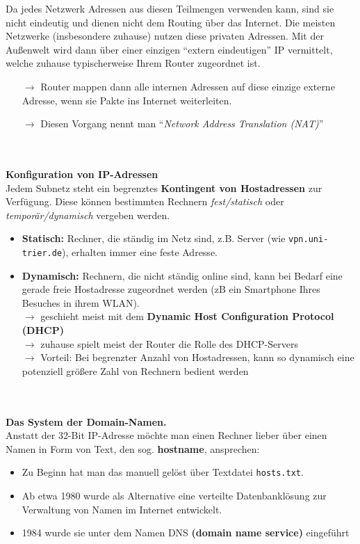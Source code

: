 %
Da jedes Netzwerk Adressen aus diesen Teilmengen verwenden kann, sind sie nicht eindeutig und dienen nicht dem Routing über das Internet. Die meisten Netzwerke (insbesondere zuhause) nutzen diese privaten Adressen. Mit der Außenwelt wird dann über einer einzigen ``extern eindeutigen'' IP vermittelt, welche zuhause typischerweise Ihrem Router zugeordnet ist.
\begin{itemize}
	\item[$\to$] Router mappen dann alle internen Adressen auf diese einzige externe Adresse, wenn sie Pakte ins Internet weiterleiten. 
\item[$\to$] Diesen Vorgang nennt man ``\textit{Network Address Translation (NAT)}''
\end{itemize}
%
%
~\\~\\
\textbf{Konfiguration von IP-Adressen}\\
Jedem Subnetz steht ein begrenztes \textbf{Kontingent von Hostadressen} zur Verfügung. Diese können bestimmten Rechnern \textit{fest/statisch} oder \textit{temporär/dynamisch} vergeben werden. 
\begin{itemize}
	\item \textbf{Statisch:} Rechner, die ständig im Netz sind, z.B. Server (wie \texttt{vpn.uni-trier.de}), erhalten immer eine feste Adresse.
	\item \textbf{Dynamisch:} Rechnern, die nicht ständig online sind, kann bei Bedarf eine
	gerade freie Hostadresse zugeordnet werden (zB ein Smartphone Ihres Besuches in ihrem WLAN).\\
	$\to$ geschieht meist mit dem \textbf{Dynamic Host Configuration Protocol (DHCP)}\\
	$\to$ zuhause spielt meist der Router die Rolle des DHCP-Servers\\
	$\to$ Vorteil: Bei begrenzter Anzahl von Hostadressen, kann so dynamisch eine potenziell größere Zahl von Rechnern bedient werden
\end{itemize} 
%
~\\~\\
\textbf{Das System der Domain-Namen.}\\
Anstatt der 32-Bit IP-Adresse möchte man einen Rechner lieber über einen Namen in Form von Text, den sog. \textbf{hostname}, ansprechen:
\begin{itemize}
	\item Zu Beginn hat man das manuell gelöst über Textdatei \texttt{hosts.txt}.
	\item Ab etwa 1980 wurde als Alternative eine verteilte Datenbanklösung zur Verwaltung von Namen im Internet
	entwickelt. 
	\item 1984 wurde sie unter dem Namen DNS \textbf{(domain name service)} eingeführt
\end{itemize}
